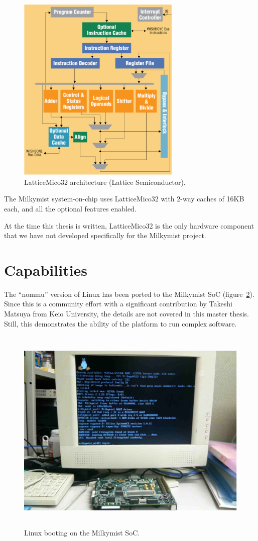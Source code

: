 \documentclass[a4paper,11pt]{kthesis}
\begin{document}
\begin{figure}[htp]
\centering
\includegraphics[height=90mm]{lm32arch.eps}
\caption{LatticeMico32 architecture (Lattice Semiconductor).}
\label{fig:lm32arch}
\end{figure}

The Milkymist system-on-chip uses LatticeMico32 with 2-way caches of 16KB each, and all the optional features enabled.

At the time this thesis is written, LatticeMico32 is the only hardware component that we have not developed specifically for the Milkymist project.

\section{Capabilities}
The ``nommu'' version of Linux has been ported to the Milkymist SoC (figure~\ref{fig:linux}). Since this is a community effort with a significant contribution by Takeshi Matsuya from Keio University, the details are not covered in this master thesis. Still, this demonstrates the ability of the platform to run complex software.

\begin{figure}[htp]
\centering
\includegraphics[height=100mm]{linux.eps}
\caption{Linux booting on the Milkymist SoC.}
\label{fig:linux}
\end{figure}
\end{document}
